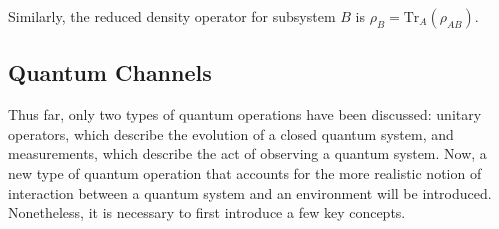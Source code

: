 Similarly, the reduced density operator for subsystem $B$ is $\rho_{B} = \text{Tr}_{A}(\rho_{AB})$.









\subsection{Quantum Channels} \label{subsec:quantum_channels}


Thus far, only two types of quantum operations have been discussed: unitary operators, which describe the evolution of a closed quantum system, and measurements, which describe the act of observing a quantum system. Now, a new type of quantum operation that accounts for the more realistic notion of interaction between a quantum system and an environment will be introduced. Nonetheless, it is necessary to first introduce a few key concepts.




